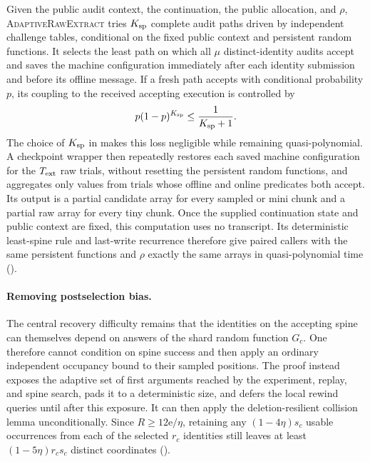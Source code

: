 \documentclass[11pt]{article}
\begin{document}
Given the public audit context, the continuation, the public allocation, and
$\rho$, \textsc{AdaptiveRawExtract} tries $K_{\rm sp}$ complete audit paths
driven by independent challenge tables, conditional on the fixed public
context and persistent random functions.  It selects the least path on which
all $\mu$ distinct-identity audits accept and saves the machine configuration
immediately after each identity submission and before its offline message.
If a fresh path accepts with conditional probability $p$, its coupling to the
received accepting execution is controlled by
\[
 p(1-p)^{K_{\rm sp}}\le\frac1{K_{\rm sp}+1}.
\]
The choice of $K_{\rm sp}$ in  makes this loss negligible
while remaining quasi-polynomial.  A checkpoint wrapper then repeatedly
restores each saved machine configuration for the $T_{\rm ext}$ raw trials,
without resetting the persistent random functions, and aggregates only values
from trials whose offline and online predicates both accept.  Its output is a
partial candidate array for every sampled or mini chunk and a partial raw array
for every tiny chunk.  Once the supplied continuation state and public context
are fixed, this computation uses no transcript.  Its deterministic least-spine
rule and last-write recurrence therefore give paired callers with the same
persistent functions and $\rho$ exactly the same arrays in quasi-polynomial
time ().

\paragraph{Removing postselection bias.}
The central recovery difficulty remains that the identities on the accepting
spine can themselves depend on answers of the shard random function $G_c$.
One therefore cannot condition on spine success and then apply an ordinary
independent occupancy bound to their sampled positions.  The proof instead
exposes the adaptive set of first arguments reached by the experiment, replay,
and spine search, pads it to a deterministic size, and defers the local rewind
queries until after this exposure.  It can then apply the deletion-resilient
collision lemma unconditionally.  Since $R\ge12\mathrm e/\eta$, retaining any
$(1-4\eta)s_c$ usable occurrences from each of the selected $r_c$ identities
still leaves at least $(1-5\eta)r_cs_c$ distinct coordinates
().
\end{document}

